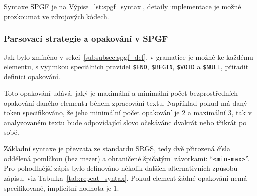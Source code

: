 Syntaxe SPGF je na Výpise~\ref{lst:spgf_syntax}, detaily implementace je možné
prozkoumat ve zdrojových kódech.


\subsubsection{Parsovací strategie a opakování v SPGF}
Jak bylo zmíněno v sekci~\ref{subsubsec:spgf_def}, v gramatice je možné ke každému elementu,
s výjimkou speciálních pravidel \texttt{\$END}, \texttt{\$BEGIN}, \texttt{\$VOID} a \texttt{\$NULL},
přiřadit definici opakování.

Toto opakování udává, jaký je maximální a minimální počet bezprostředních opakování daného elementu během zpracování textu.
Například pokud má daný token specifikováno, že jeho minimální počet opakování je 2 a maximální 3,
tak v analyzovaném textu bude odpovídající slovo očekáváno dvakrát nebo třikrát po sobě.

Základní syntaxe je převzata ze standardu SRGS,
tedy dvě přirozená čísla oddělená pomlčkou (bez mezer) a ohraničené špičatými závorkami: \enquote{\texttt{<min-max>}}.
Pro pohodlnější zápis bylo definováno několik dalších alternativních
způsobů zápisu, viz Tabulka~\ref{tab:repeat_syntax}.
Pokud element žádné opakování nemá specifikované, implicitní hodnota je 1.

